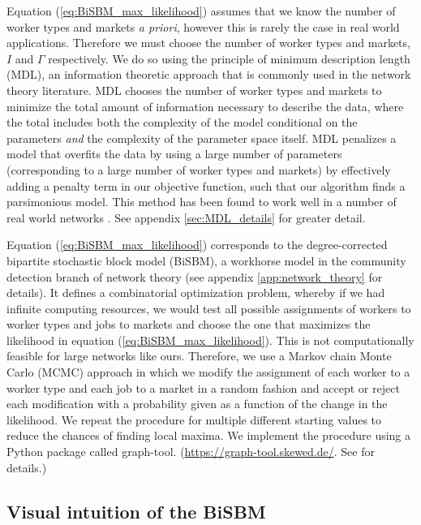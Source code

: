 \documentclass[12pt]{article}
\theoremstyle{definition}
\theoremstyle{plain}
\begin{document}
Equation (\ref{eq:BiSBM_max_likelihood}) assumes that we know the number of worker types and markets \emph{a priori}, however this is rarely the case in real world applications. Therefore we must choose the number of worker types and markets, $I$ and $\Gamma$ respectively. We do so using the principle of minimum description length (MDL), an information theoretic approach that is commonly used in the network theory literature. MDL chooses the number of worker types and markets to minimize the total amount of information necessary to describe the data, where the total includes both the complexity of the model conditional on the parameters \emph{and} the complexity of the parameter space itself. MDL penalizes a model that overfits the data by using a large number of parameters (corresponding to a large number of worker types and markets) by effectively adding a penalty term in our objective function, such that our algorithm finds a parsimonious model. This method has been found to work well in a number of real world networks \citep{Peixoto2013,Peixoto2014,RosvallBergstrom2007}. See appendix \ref{sec:MDL_details} for greater detail.



Equation (\ref{eq:BiSBM_max_likelihood}) corresponds to the degree-corrected bipartite stochastic block model (BiSBM), a workhorse model in the community detection branch of network theory (see appendix \ref{app:network_theory} for details). It defines a combinatorial optimization problem, whereby if we had infinite computing resources, we would test all possible  assignments of workers to worker types and jobs to markets and choose the one that maximizes the likelihood in equation (\ref{eq:BiSBM_max_likelihood}). This is not computationally feasible for large networks like ours. Therefore, we use a Markov chain Monte Carlo (MCMC) approach in which we modify the assignment of each worker to a worker type and each job to a market in a random fashion and accept or reject each modification with a probability given as a function of the change in the likelihood. We repeat the procedure for multiple different starting values to reduce the chances of finding local maxima. We implement the procedure using a Python package called graph-tool. (\url{https://graph-tool.skewed.de/}. See \citet{Peixoto2014_efficient} for details.)



\subsection{Visual intuition of the BiSBM}
\end{document}
